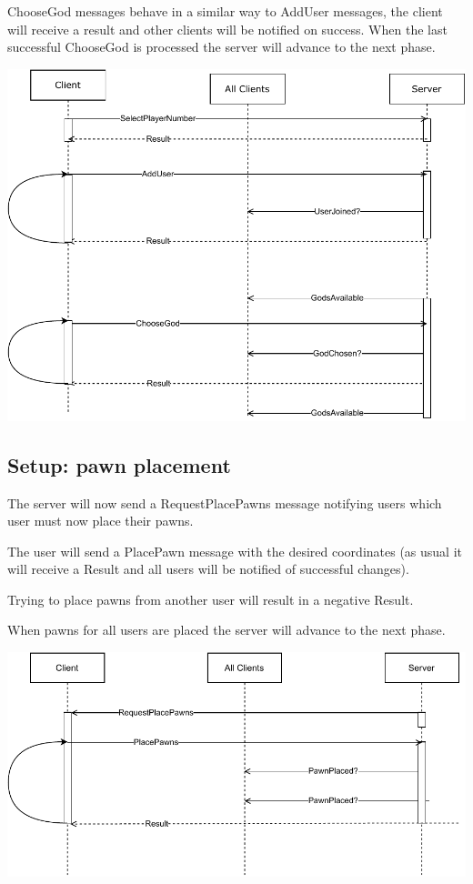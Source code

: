 \documentclass{article}
\begin{document}
ChooseGod messages behave in a similar way to AddUser messages, the client will receive a result and other clients will be notified on success. When the last successful ChooseGod is processed the server will advance to the next phase.

\vspace{8pt}
\includegraphics[width=0.85\linewidth]{communication_uml_1.pdf}

\subsection*{Setup: pawn placement}
The server will now send a RequestPlacePawns message notifying users which user must now place their pawns.

The user will send a PlacePawn message with the desired coordinates (as usual it will receive a Result and all users will be notified of successful changes).

Trying to place pawns from another user will result in a negative Result.

When pawns for all users are placed the server will advance to the next phase.

\vspace{8pt}
\includegraphics[width=0.85\linewidth]{communication_uml_2.pdf}
\end{document}
